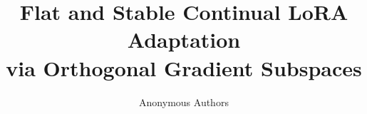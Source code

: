 \documentclass{article}
\title{Flat and Stable Continual LoRA Adaptation\\via Orthogonal Gradient Subspaces}
\author{%
  Anonymous Authors%
}
\theoremstyle{plain}
\theoremstyle{definition}
\theoremstyle{remark}
\begin{document}
\maketitle

\begin{abstract}

\end{abstract}












\newpage
\appendix


\newpage

\end{document}
